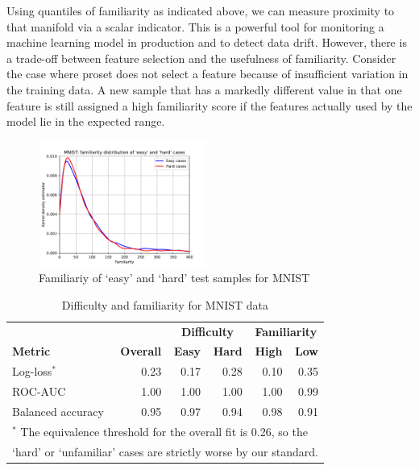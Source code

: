 Using quantiles of familiarity as indicated above, we can measure proximity to that manifold via a scalar indicator.
This is a powerful tool for monitoring a machine learning model in production and to detect data drift.
However, there is a trade-off between feature selection and the usefulness of familiarity.
Consider the case where proset does not select a feature because of insufficient variation in the training data.
A new sample that has a markedly different value in that one feature is still assigned a high familiarity score if the features actually used by the model lie in the expected range.\par
%
\begin{figure}
\caption{Familiariy of `easy' and `hard' test samples for MNIST}
\label{fig_mnist_familiarity}
%
\begin{center}
\includegraphics[width=0.49\textwidth]{figures/mnist_familiarity.pdf}
\end{center}
\end{figure}
%
\begin{table}
\caption{Difficulty and familiarity for MNIST data}
\label{tab_mnist_familiarity}
%
\begin{center}
\small
\begin{tabular}{|lrrrrr|}
\hline
&&\multicolumn{2}{c}{\textbf{Difficulty}}&\multicolumn{2}{c|}{\textbf{Familiarity}}\\
\textbf{Metric}&\textbf{Overall}&\textbf{Easy}&\textbf{Hard}&\textbf{High}&\textbf{Low}\\
Log-loss$^*$&0.23&0.17&0.28&0.10&0.35\\
ROC-AUC&1.00&1.00&1.00&1.00&0.99\\
Balanced accuracy&0.95&0.97&0.94&0.98&0.91\\
\multicolumn{6}{|l|}{$^*$ The equivalence threshold for the overall fit is 0.26, so the}\\
\multicolumn{6}{|l|}{\phantom{$^*$} `hard' or `unfamiliar' cases are strictly worse by our standard.}\\
\hline
\end{tabular}
\end{center}
\end{table}
